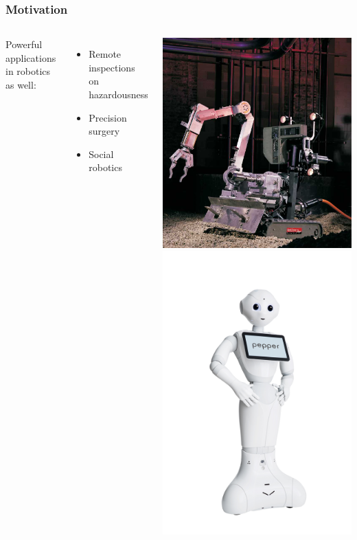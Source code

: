 \documentclass[11pt]{beamer}
\begin{document}
\begin{frame}
	\frametitle{Motivation}
		\begin{columns}
			Powerful applications in robotics as well:
			\begin{itemize}
				\item Remote inspections on hazardousness
				\item Precision surgery
				\item Social robotics
			\end{itemize}
			\includegraphics[width=0.5\linewidth]{pioneer_chernobyl} \\
			\vspace{0.5cm}
			\hfill
			\includegraphics[width=0.5\linewidth]{pepper}
		\end{columns}
\end{frame}

\end{document}
